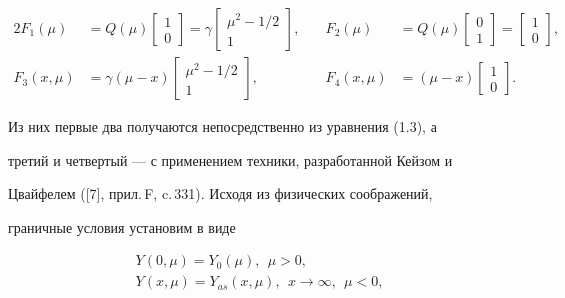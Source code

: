 \begin{alignat*}{2} 


F_1(\mu)&=Q(\mu)\begin{bmatrix} 1 \\ 0 \end{bmatrix} 


=\gamma\begin{bmatrix}\mu^2-1/2 \\1 \end{bmatrix}, &\quad 


F_2(\mu)&=Q(\mu)\begin{bmatrix}0 \\1 \end{bmatrix} 


=\begin{bmatrix} 1 \\ 0 \end{bmatrix}, \\ 


% 


F_3(x,\mu)&=\gamma(\mu-x) \begin{bmatrix} \mu^2-1/2 \\ 1 \end{bmatrix}, 


&\quad F_4(x,\mu)&=(\mu-x)\begin{bmatrix} 1 \\ 0 \end{bmatrix}. 


\end{alignat*} 


Из них первые два получаются непосредственно из уравнения (1.3), а 


третий и четвертый --- с применением техники, разработанной Кейзом и 


Цвайфелем ([7], прил.\,F, c.\,331). Исходя из физических соображений, 


граничные условия установим в виде 


\begin{equation} 


\begin{array}{c} 


Y(0,\mu)=Y_0(\mu),\ \ \mu>0,\\[2mm] 


Y(x,\mu)=Y_{as}(x,\mu),\ \ x\to\infty,\ \ \mu<0 ,


\end{array} 


\end{equation} 


